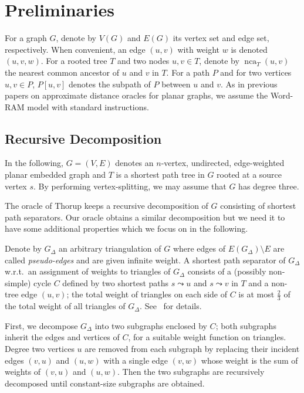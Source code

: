 \documentclass[11pt]{article}
\def\nca{\operatorname{nca}}
\begin{document}
\section{Preliminaries}\label{sec:Prelim}
For a graph $G$, denote by $V(G)$ and $E(G)$ its vertex set and edge set, respectively. When convenient, an edge $(u,v)$ with weight $w$ is denoted $(u,v,w)$. For a rooted tree $T$ and two nodes $u,v\in T$, denote by $\nca_T(u,v)$ the nearest common ancestor of $u$ and $v$ in $T$. For a path $P$ and for two vertices $u,v\in P$, $P[u,v]$ denotes the subpath of $P$ between $u$ and $v$. As in previous papers on approximate distance oracles for planar graphs, we assume the Word-RAM model with standard instructions.

\subsection{Recursive Decomposition}\label{subsec:RecDecomp}
In the following, $G = (V,E)$ denotes an $n$-vertex, undirected, edge-weighted planar embedded graph and $T$ is a shortest path tree in $G$ rooted at a source vertex $s$. By performing vertex-splitting, we may assume that $G$ has degree three.

The oracle of Thorup keeps a recursive decomposition of $G$ consisting of shortest path separators. Our oracle obtains a similar decomposition but we need it to have some additional properties which we focus on in the following.

Denote by $G_\Delta$ an arbitrary triangulation of $G$ where edges of $E(G_\Delta)\setminus E$ are called \emph{pseudo-edges} and are given infinite weight. A shortest path separator of $G_\Delta$ w.r.t.~an assignment of weights to triangles of $G_\Delta$ consists of a (possibly non-simple) cycle $C$ defined by two shortest paths $s\leadsto u$ and $s\leadsto v$ in $T$ and a non-tree edge $(u,v)$; the total weight of triangles on each side of $C$ is at most $\frac 2 3$ of the total weight of all triangles of $G_\Delta$. See~\cite{LiptonTarjan,OraclePlanarThorup} for details.

First, we decompose $G_\Delta$ into two subgraphs enclosed by $C$; both subgraphs inherit the edges and vertices of $C$, for a suitable weight function on triangles. Degree two vertices $u$ are removed from each subgraph by replacing their incident edges $(v,u)$ and $(u,w)$ with a single edge $(v,w)$ whose weight is the sum of weights of $(v,u)$ and $(u,w)$. Then the two subgraphs are recursively decomposed until constant-size subgraphs are obtained.
\end{document}
